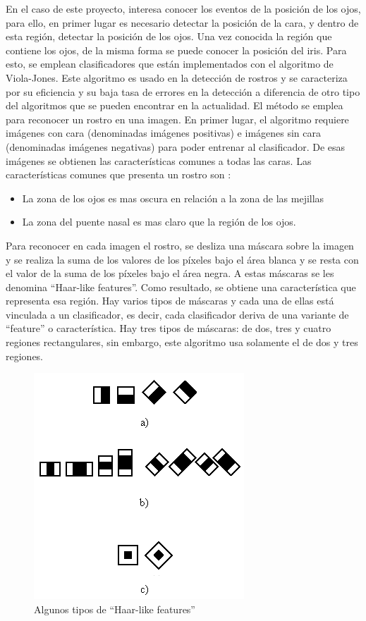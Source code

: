 En el caso de este proyecto, interesa conocer los eventos de la posición de los ojos, para ello, en primer lugar es necesario detectar la posición de la cara, y dentro de esta región, detectar la posición de los ojos. Una vez conocida la región que contiene los ojos, de la misma forma se puede conocer la posición del iris. Para esto, se emplean clasificadores que están implementados con el algoritmo de Viola-Jones. Este algoritmo es usado en la detección de rostros y se caracteriza por su eficiencia y su baja tasa de errores en la detección a diferencia de otro tipo del algoritmos que se pueden encontrar en la actualidad. El método se emplea para reconocer un rostro en una imagen. En primer lugar, el algoritmo requiere imágenes con cara (denominadas imágenes positivas) e imágenes sin cara (denominadas imágenes negativas) para poder entrenar al clasificador. De esas imágenes se obtienen las características comunes a todas las caras.
Las características comunes que presenta un rostro son \citep{iglesias2016reconocimiento}:
\begin{itemize}
\item La zona de los ojos es mas oscura en relación a la zona de las mejillas
\item La zona del puente nasal es mas claro que la región de los ojos. 
\end{itemize}

Para reconocer en cada imagen el rostro, se desliza una máscara sobre la imagen y se realiza la suma de los valores de los píxeles bajo el área blanca y se resta con el valor de la suma de los píxeles bajo el área negra. A estas máscaras se les denomina ``Haar-like features''. Como resultado, se obtiene una característica que representa esa región. Hay varios tipos de máscaras y cada una de ellas está vinculada a un clasificador, es decir, cada clasificador deriva de una variante de ``feature'' o característica. Hay tres tipos de máscaras: de dos, tres y cuatro regiones rectangulares, sin embargo, este algoritmo usa solamente el de dos y tres regiones. 

\begin{figure}
\centering
\includegraphics[scale = 0.7]{capitulo_02/figuras_dir/mascaras.jpg}
\caption{Algunos tipos de ``Haar-like features''}
\end{figure}

